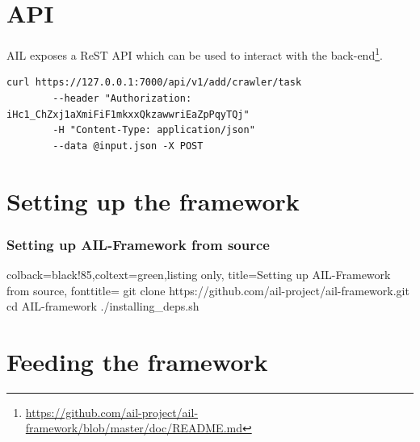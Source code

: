 \documentclass[aspectratio=169]{beamer}
\begin{document}
\section{API}

\begin{frame}[fragile]
AIL exposes a ReST API which can be used to interact with the back-end\footnote{\url{https://github.com/ail-project/ail-framework/blob/master/doc/README.md}}.

        \begin{lstlisting}
curl https://127.0.0.1:7000/api/v1/add/crawler/task
        --header "Authorization: iHc1_ChZxj1aXmiFiF1mkxxQkzawwriEaZpPqyTQj"
        -H "Content-Type: application/json"
        --data @input.json -X POST
        \end{lstlisting}
\end{frame}

\section{Setting up the framework}
\lstset{style=bash}
\begin{frame}[fragile]
    \frametitle{Setting up AIL-Framework from source}
    \begin{tcblisting}{colback=black!85,coltext=green,listing only,
        title=Setting up AIL-Framework from source, fonttitle=\bfseries}
git clone https://github.com/ail-project/ail-framework.git
cd AIL-framework
./installing_deps.sh
\end{tcblisting}
\end{frame}

\section{Feeding the framework}
\end{document}
